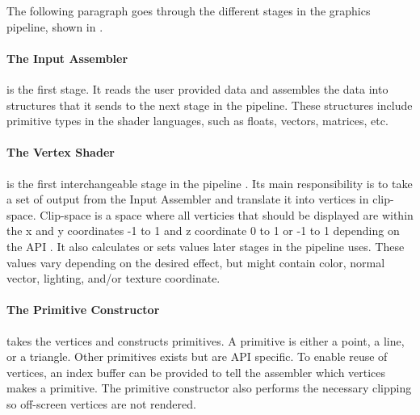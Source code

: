 
The following paragraph goes through the different stages in the graphics pipeline, shown in .

\paragraph{The Input Assembler} is the first stage. 
It reads the user provided data and assembles the data into structures that it sends to the next stage in the pipeline. 
These structures include primitive types in the shader languages, such as floats, vectors, matrices, etc.

\paragraph{The Vertex Shader} is the first interchangeable stage in the pipeline .
Its main responsibility is to take a set of output from the Input Assembler and translate it into vertices in clip-space.
Clip-space is a space where all verticies that should be displayed are within the x and y coordinates -1 to 1 and z coordinate 0 to 1 or -1 to 1 depending on the \gls{API} .
It also calculates or sets values later stages in the pipeline uses.
These values vary depending on the desired effect, but might contain color, normal vector, lighting, and/or texture coordinate.

\paragraph{The Primitive Constructor} takes the vertices and constructs primitives.
A primitive is either a point, a line, or a triangle.
Other primitives exists but are \gls{API} specific.
To enable reuse of vertices, an index buffer can be provided to tell the assembler which vertices makes a primitive.
The primitive constructor also performs the necessary clipping so off-screen vertices are not rendered.

